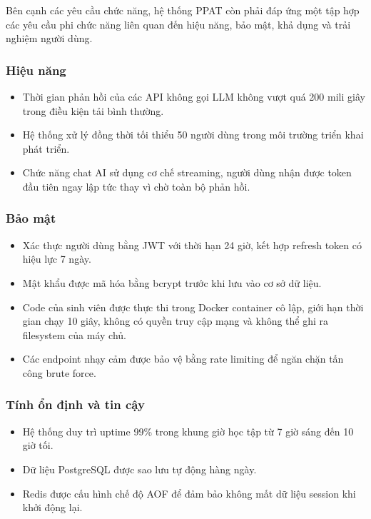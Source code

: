 \documentclass[../main.tex]{subfiles}
\begin{document}
Bên cạnh các yêu cầu chức năng, hệ thống PPAT còn phải đáp ứng một tập hợp các yêu cầu phi chức năng liên quan đến hiệu năng, bảo mật, khả dụng và trải nghiệm người dùng.

\subsubsection{Hiệu năng}

\begin{itemize}
    \item Thời gian phản hồi của các API không gọi LLM không vượt quá 200 mili giây trong điều kiện tải bình thường.
    \item Hệ thống xử lý đồng thời tối thiểu 50 người dùng trong môi trường triển khai phát triển.
    \item Chức năng chat AI sử dụng cơ chế streaming, người dùng nhận được token đầu tiên ngay lập tức thay vì chờ toàn bộ phản hồi.
\end{itemize}

\subsubsection{Bảo mật}

\begin{itemize}
    \item Xác thực người dùng bằng JWT với thời hạn 24 giờ, kết hợp refresh token có hiệu lực 7 ngày.
    \item Mật khẩu được mã hóa bằng bcrypt trước khi lưu vào cơ sở dữ liệu.
    \item Code của sinh viên được thực thi trong Docker container cô lập, giới hạn thời gian chạy 10 giây, không có quyền truy cập mạng và không thể ghi ra filesystem của máy chủ.
    \item Các endpoint nhạy cảm được bảo vệ bằng rate limiting để ngăn chặn tấn công brute force.
\end{itemize}

\subsubsection{Tính ổn định và tin cậy}

\begin{itemize}
    \item Hệ thống duy trì uptime 99\% trong khung giờ học tập từ 7 giờ sáng đến 10 giờ tối.
    \item Dữ liệu PostgreSQL được sao lưu tự động hàng ngày.
    \item Redis được cấu hình chế độ AOF để đảm bảo không mất dữ liệu session khi khởi động lại.
\end{itemize}
\end{document}
